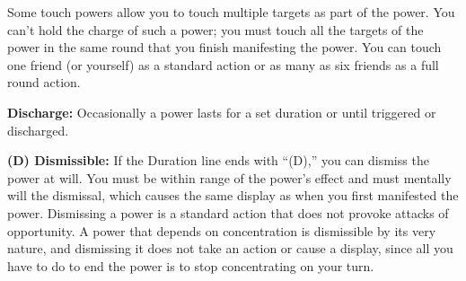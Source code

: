 Some touch powers allow you to touch multiple targets as part of the power. You can't hold the charge of such a power; you must touch all the targets of the power in the same round that you finish manifesting the power. You can touch one friend (or yourself) as a standard action or as many as six friends as a full round action.

\textbf{Discharge:} Occasionally a power lasts for a set duration or until triggered or discharged.

\textbf{(D) Dismissible:} If the Duration line ends with ``(D),'' you can dismiss the power at will. You must be within range of the power's effect and must mentally will the dismissal, which causes the same display as when you first manifested the power. Dismissing a power is a standard action that does not provoke attacks of opportunity. A power that depends on concentration is dismissible by its very nature, and dismissing it does not take an action or cause a display, since all you have to do to end the power is to stop concentrating on your turn.